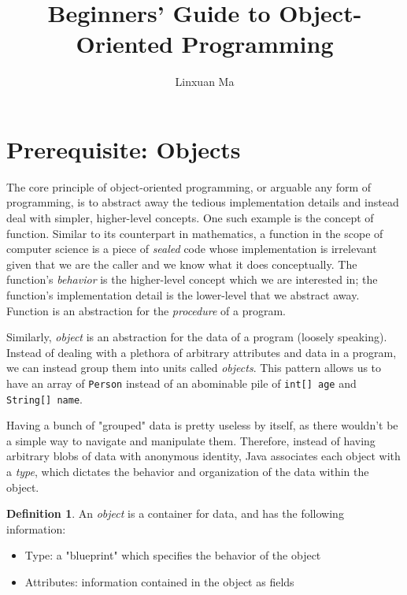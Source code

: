 \documentclass[12pt]{article}
\title{\vspace{-2.0cm}Beginners' Guide to Object-Oriented Programming}
\author{Linxuan Ma}
\theoremstyle{definition}
\newtheorem{defn}{Definition}[section]
\newcommand{\code}[1]{\colorbox{codegray}{\texttt{#1}}}
\begin{document}
	\maketitle
	
	
	\section{Prerequisite: Objects}
	
	The core principle of object-oriented programming, or arguable any form of programming, is to abstract away the tedious implementation details and instead deal with simpler, higher-level concepts. One such example is the concept of function. Similar to its counterpart in mathematics, a function in the scope of computer science is a piece of \emph{sealed} code whose implementation is irrelevant given that we are the caller and we know what it does conceptually. The function's \textit{behavior} is the higher-level concept which we are interested in; the function's implementation detail is the lower-level that we abstract away. Function is an abstraction for the \emph{procedure} of a program.
	
	Similarly, \emph{object} is an abstraction for the data of a program (loosely speaking). Instead of dealing with a plethora of arbitrary attributes and data in a program, we can instead group them into units called \emph{objects}. This pattern allows us to have an array of \code{Person} instead of an abominable pile of \code{int[] age} and \code{String[] name}.
	
	Having a bunch of "grouped" data is pretty useless by itself, as there wouldn't be a simple way to navigate and manipulate them. Therefore, instead of having arbitrary blobs of data with anonymous identity, Java associates each object with a \emph{type}, which dictates the behavior and organization of the data within the object.
	
	\begin{defn}
		An \emph{object} is a container for data, and has the following information:
		\begin{itemize}
			\item Type: a "blueprint" which specifies the behavior of the object
			\item Attributes: information contained in the object as fields
		\end{itemize}
	\end{defn}
	
\end{document}

